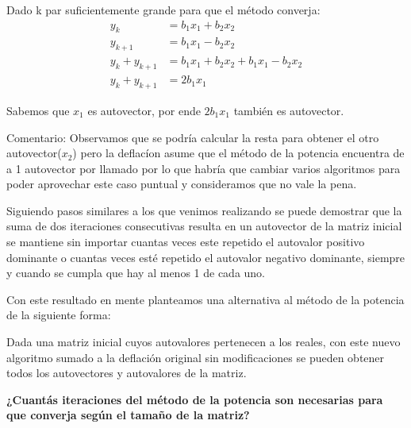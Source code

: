 \vspace{1em}
Dado k par suficientemente grande para que el método converja: 
\begin{align}
    y_k &= b_1 x_1 + b_2 x_2 \\ 
    y_{k+1} &= b_1 x_1 - b_2 x_2 \\ 
    y_k + y_{k+1} &= b_1 x_1 + b_2 x_2 + b_1 x_1 - b_2 x_2 \\ 
    y_k + y_{k+1} &= 2 b_1 x_1
\end{align}

Sabemos que $x_1$ es autovector, por ende $2 b_1 x_1$ también es autovector.

\vspace{1em}

Comentario: Observamos que se podría calcular la resta para obtener el otro autovector($x_2$) pero la deflacíon asume que el método de la potencia encuentra de a 1 autovector por llamado por lo que habría que cambiar varios algoritmos para poder aprovechar este caso puntual y consideramos que no vale la pena.

\vspace{1em}

Siguiendo pasos similares a los que venimos realizando se puede demostrar que la suma de dos iteraciones consecutivas resulta en un autovector de la matriz inicial se mantiene sin importar cuantas veces este repetido el autovalor positivo dominante o cuantas veces esté repetido el autovalor negativo dominante, siempre y cuando se cumpla que hay al menos 1 de cada uno.

\vspace{1em}
Con este resultado en mente planteamos una alternativa al método de la potencia de la siguiente forma:

\vspace{1em}


\vspace{1em}
Dada una matriz inicial cuyos autovalores pertenecen a los reales, con este nuevo algoritmo sumado a la deflación original sin modificaciones se pueden obtener todos los autovectores y autovalores de la matriz.

\vspace{1em}

\begin{large}  
    \textbf{¿Cuantás iteraciones del método de la potencia son necesarias para que converja según el tamaño de la matriz?}
\end{large}  

